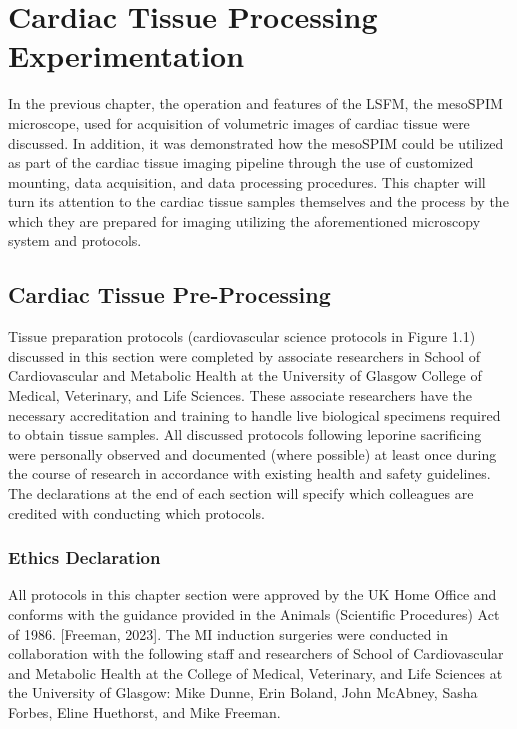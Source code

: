 \chapter{Cardiac Tissue Processing Experimentation}
In the previous chapter, the operation and features of the LSFM, the mesoSPIM microscope, used for acquisition of volumetric images of cardiac tissue were discussed. In addition, it was demonstrated how the mesoSPIM could be utilized as part of the cardiac tissue imaging pipeline through the use of customized mounting, data acquisition, and data processing procedures. This chapter will turn its attention to the cardiac tissue samples themselves and the process by the which they are prepared for imaging utilizing the aforementioned microscopy system and protocols.

\section{Cardiac Tissue Pre-Processing}
Tissue preparation protocols (cardiovascular science protocols in Figure 1.1) discussed in this section were completed by associate researchers in School of Cardiovascular and Metabolic Health at the University of Glasgow College of Medical, Veterinary, and Life Sciences. These associate researchers have the necessary accreditation and training to handle live biological specimens required to obtain tissue samples. All discussed protocols following leporine sacrificing were personally observed and documented (where possible) at least once during the course of research in accordance with existing health and safety guidelines. The declarations at the end of each section will specify which colleagues are credited with conducting which protocols. 

\subsection{Ethics Declaration}

All protocols in this chapter section were approved by the UK Home Office and conforms with the guidance provided in the Animals (Scientific Procedures) Act of 1986. [Freeman, 2023]. The MI induction surgeries were conducted in collaboration with the following staff and researchers of School of Cardiovascular and Metabolic Health at the College of Medical, Veterinary, and Life Sciences at the University of Glasgow: Mike Dunne, Erin Boland, John McAbney, Sasha Forbes, Eline Huethorst, and Mike Freeman.  

